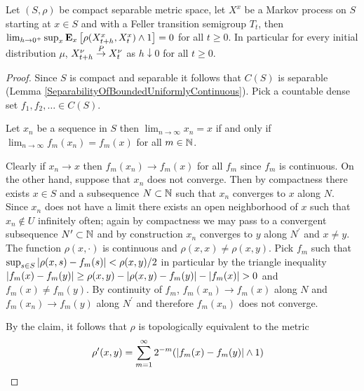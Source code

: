 \begin{lem}\label{FellerSemigroupProbabilisticStrongContinuity}Let $(S, \rho)$ be compact separable metric space, let $X^x$ be a Markov process on $S$ starting at $x \in S$ and with a Feller transition semigroup $T_t$, then $\lim_{h \to 0^+} \sup_{x} \sexpectation{\rho(X^x_{t+h}, X^x_t) \wedge 1}{x} = 0$ for all $t \geq 0$.  In particular for every initial distribution $\mu$,  $X^\nu_{t+h} \toprob X^\nu_t$ as $h \downarrow 0$ for all $t \geq 0$.
\end{lem}
\begin{proof}
Since $S$ is compact and separable it follows that $C(S)$ is separable (Lemma \ref{SeparabilityOfBoundedUniformlyContinuous}).  Pick a countable dense set $f_1, f_2, \dotsc \in C(S)$.  

\begin{clm}Let $x_n$ be a sequence in $S$ then $\lim_{n \to \infty} x_n = x$ if and only if $\lim_{n \to \infty} f_m(x_n) = f_m(x)$ for all $m \in \naturals$.
\end{clm}
Clearly if $x_n \to x$ then $f_m(x_n) \to f_m(x)$ for all $f_m$ since $f_m$ is continuous.  On the other hand, suppose that $x_n$ does not converge.  Then by compactness there exists $x \in S$ and a subsequence $N \subset \naturals$ such that $x_n$ converges to $x$ along $N$.  Since $x_n$ does not have a limit there exists an open neighborhood of $x$ such that $x_n \notin U$ infinitely often; again by compactness we may pass to a convergent subsequence $N^\prime \subset \naturals$ and by construction $x_n$ converges to $y$ along $N^\prime$ and $x \neq y$.  The function $\rho(x, \cdot)$ is continuous and $\rho(x,x) \neq \rho(x,y)$.  Pick $f_m$ such that $\sup_{s \in S} \abs{\rho(x,s) - f_m(s)} < \rho(x,y)/2$ in particular by the triangle inequality $\abs{f_m(x) - f_m(y)} \geq \rho(x,y) - \abs{\rho(x,y) - f_m(y)} - \abs{f_m(x)} > 0$ and $f_m(x) \neq f_m(y)$.   By continuity of $f_m$, $f_m(x_n) \to f_m(x)$ along $N$ and $f_m(x_n) \to f_m(y)$ along $N^\prime$ and therefore $f_m(x_n)$ does not converge.

By the claim, it follows that $\rho$ is topologically equivalent to the metric 
\begin{align*}
\rho^{\prime}(x,y) &= \sum_{m=1}^\infty 2^{-m} (\abs{f_m(x) - f_m(y)} \wedge 1)
\end{align*}


\end{proof}
